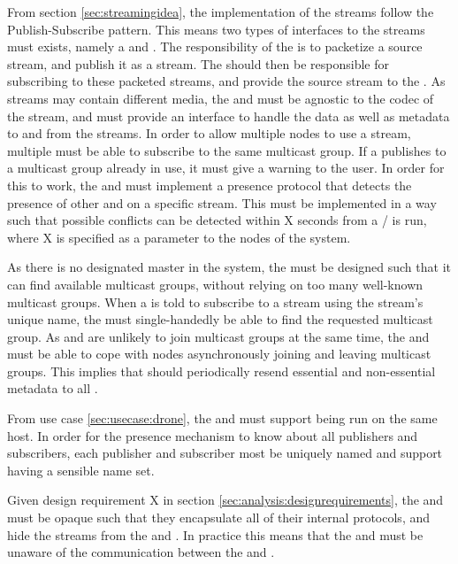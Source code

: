 From section \ref{sec:streamingidea}, the implementation of the streams follow the Publish-Subscribe pattern. This means two types of interfaces to the streams must exists, namely a \pub{} and \sub{}. The responsibility of the \pub{} is to packetize a source stream, and publish it as a stream. The \subs{} should then be responsible for subscribing to these packeted streams, and provide the source stream to the \con{}.
As streams may contain different media, the  and  must be agnostic to the codec of the stream, and must provide an interface to handle the data as well as metadata to and from the streams.
In order to allow multiple nodes to use a stream, multiple  must be able to subscribe to the same multicast group.
If a  publishes to a multicast group already in use, it must give a warning to the user. In order for this to work, the  and  must implement a presence protocol that detects the presence of other  and  on a specific stream. This must be implemented in a way such that possible conflicts can be detected within X seconds from a / is run, where X is specified as a parameter to the nodes of the system.

As there is no designated master in the system, the  must be designed such that it can find available multicast groups, without relying on too many well-known multicast groups. When a  is told to subscribe to a stream using the stream's unique name, the \sub{} must single-handedly be able to find the requested multicast group.
As  and  are unlikely to join multicast groups at the same time, the  and  must be able to cope with nodes asynchronously joining and leaving multicast groups. This implies that  should periodically resend essential and non-essential metadata to all .

From use case \ref{sec:usecase:drone}, the \pubs{} and \subs{} must support being run on the same host. In order for the presence mechanism to know about all publishers and subscribers, each publisher and subscriber most be uniquely named and support having a sensible name set.

Given design requirement X in section \ref{sec:analysis:designrequirements}, the  and  must be opaque such that they encapsulate all of their internal protocols, and hide the streams from the \cons{} and \pros{}. In practice this means that the  and  must be unaware of the communication between the  and .


